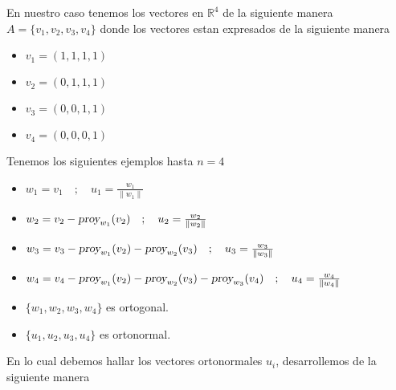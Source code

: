 En nuestro caso tenemos los vectores en $\mathbb{R}^4$ de la siguiente manera $A = \{ {v}_{1}, {v}_{2}, {v}_{3}, {v}_{4} \}$ donde los vectores estan expresados de la siguiente manera
\begin{itemize}
    \item ${v}_{1} = (1, 1, 1, 1)$
    \item ${v}_{2} = (0, 1, 1, 1)$
    \item ${v}_{3} = (0, 0, 1, 1)$
    \item ${v}_{4} = (0, 0, 0, 1)$
\end{itemize}
Tenemos los siguientes ejemplos hasta $n = 4$
\begin{itemize}
    \item ${w}_{1} = {v}_{1} \quad ; \quad {u}_{1} = \frac{{w}_{1}}{\|{w}_{1} \|}$
    \item ${w}_{2} = {v}_{2} - {\textsl{proy}}_{{w}_{1}}({v}_{2}) \quad ; \quad {u}_{2} = \frac{{w}_{2}}{\|{w}_{2} \|}$
    \item ${w}_{3} = {v}_{3} - {\textsl{proy}}_{{w}_{1}}({v}_{2}) - {\textsl{proy}}_{{w}_{2}}({v}_{3}) \quad ; \quad {u}_{3} = \frac{{w}_{3}}{\|{w}_{3} \|}$
    \item ${w}_{4} = {v}_{4} - {\textsl{proy}}_{{w}_{1}}({v}_{2}) - {\textsl{proy}}_{{w}_{2}}({v}_{3}) - {\textsl{proy}}_{{w}_{3}}({v}_{4}) \quad ; \quad {u}_{4} = \frac{{w}_{4}}{\|{w}_{4} \|}$
    \item $\{ {w}_{1}, {w}_{2}, {w}_{3} , {w}_{4} \}$ es ortogonal.
    \item $\{ {u}_{1}, {u}_{2} , {u}_{3}, {u}_{4} \}$ es ortonormal.
\end{itemize}
En lo cual debemos hallar los vectores ortonormales ${u}_{i}$, desarrollemos de la siguiente manera
